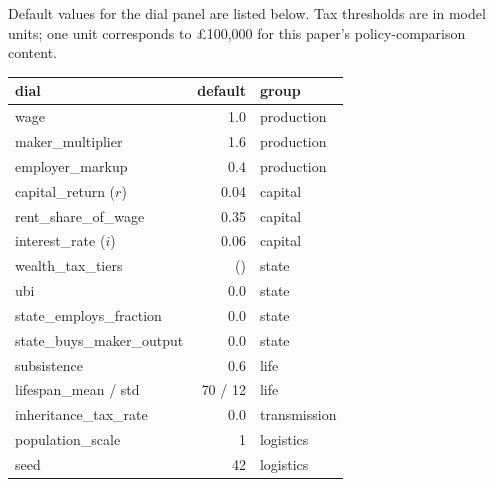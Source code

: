 \documentclass[11pt]{article}
\begin{document}
Default values for the dial panel are listed below.  Tax thresholds
are in model units; one unit corresponds to \pounds 100{,}000 for
this paper's policy-comparison content.

\begin{table}[h]
\centering
\small
\begin{tabular}{lrl}
\toprule
dial & default & group \\
\midrule
wage                          & 1.0 & production \\
maker\_multiplier             & 1.6 & production \\
employer\_markup              & 0.4 & production \\
capital\_return ($r$)         & 0.04 & capital \\
rent\_share\_of\_wage         & 0.35 & capital \\
interest\_rate ($i$)          & 0.06 & capital \\
wealth\_tax\_tiers            & ()   & state \\
ubi                           & 0.0  & state \\
state\_employs\_fraction      & 0.0  & state \\
state\_buys\_maker\_output    & 0.0  & state \\
subsistence                   & 0.6  & life \\
lifespan\_mean / std          & 70 / 12 & life \\
inheritance\_tax\_rate        & 0.0  & transmission \\
population\_scale             & 1    & logistics \\
seed                          & 42   & logistics \\
\bottomrule
\end{tabular}
\end{table}
\end{document}
